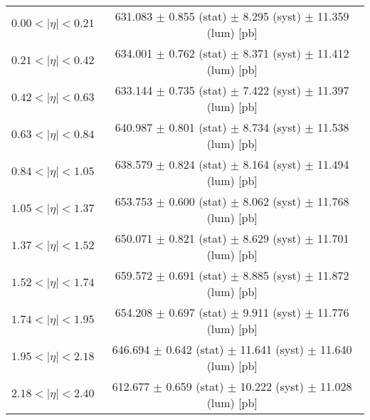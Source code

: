 \begin{tabular}{lc}
\hline
$0.00 < |\eta| <0.21$          & 631.083 $\pm$ 0.855 (stat) $\pm$ 8.295 (syst) $\pm$ 11.359 (lum) [pb]  \\
$0.21 < |\eta| <0.42$          & 634.001 $\pm$ 0.762 (stat) $\pm$ 8.371 (syst) $\pm$ 11.412 (lum) [pb]  \\
$0.42 < |\eta| <0.63$          & 633.144 $\pm$ 0.735 (stat) $\pm$ 7.422 (syst) $\pm$ 11.397 (lum) [pb]  \\
$0.63 < |\eta| <0.84$          & 640.987 $\pm$ 0.801 (stat) $\pm$ 8.734 (syst) $\pm$ 11.538 (lum) [pb]  \\
$0.84 < |\eta| <1.05$          & 638.579 $\pm$ 0.824 (stat) $\pm$ 8.164 (syst) $\pm$ 11.494 (lum) [pb]  \\
$1.05 < |\eta| <1.37$          & 653.753 $\pm$ 0.600 (stat) $\pm$ 8.062 (syst) $\pm$ 11.768 (lum) [pb]  \\
$1.37 < |\eta| <1.52$          & 650.071 $\pm$ 0.821 (stat) $\pm$ 8.629 (syst) $\pm$ 11.701 (lum) [pb]  \\
$1.52 < |\eta| <1.74$          & 659.572 $\pm$ 0.691 (stat) $\pm$ 8.885 (syst) $\pm$ 11.872 (lum) [pb]  \\
$1.74 < |\eta| <1.95$          & 654.208 $\pm$ 0.697 (stat) $\pm$ 9.911 (syst) $\pm$ 11.776 (lum) [pb]  \\
$1.95 < |\eta| <2.18$          & 646.694 $\pm$ 0.642 (stat) $\pm$ 11.641 (syst) $\pm$ 11.640 (lum) [pb]  \\
$2.18 < |\eta| <2.40$          & 612.677 $\pm$ 0.659 (stat) $\pm$ 10.222 (syst) $\pm$ 11.028 (lum) [pb]  \\
\hline
\end{tabular}
